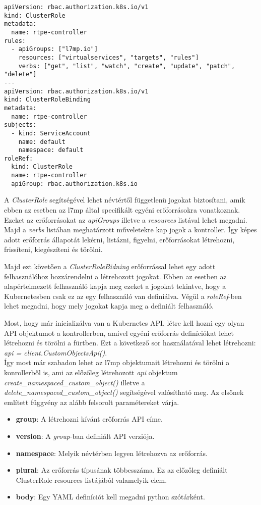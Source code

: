 \begin{lstlisting}
apiVersion: rbac.authorization.k8s.io/v1
kind: ClusterRole
metadata:
  name: rtpe-controller
rules:
  - apiGroups: ["l7mp.io"]
    resources: ["virtualservices", "targets", "rules"]
    verbs: ["get", "list", "watch", "create", "update", "patch", "delete"]
---
apiVersion: rbac.authorization.k8s.io/v1
kind: ClusterRoleBinding
metadata:
  name: rtpe-controller
subjects:
  - kind: ServiceAccount
    name: default
    namespace: default
roleRef:
  kind: ClusterRole
  name: rtpe-controller
  apiGroup: rbac.authorization.k8s.io
\end{lstlisting}

A \textit{ClusterRole} segítségével lehet névtértől függetlenü jogokat biztosítani,
amik ebben az esetben az l7mp által specifikált egyéni erőforrásokra vonatkoznak. 
Ezeket az erőforrásokat az \textit{apiGroups} illetve a \textit{resources} listával
lehet megadni. Majd a \textit{verbs} listában meghatárzott műveletekre kap 
jogok a kontroller. Így képes adott erőforrás állapotát lekérni, listázni, figyelni,
erőforrásokat létrehozni, frissíteni, kiegészíteni és törölni. 

Majd ezt követően a \textit{ClusterRoleBidning} erőforrással lehet egy adott
felhasználóhoz hozzárendelni a létrehozott jogokat. Ebben az esetben az alapértelmezett
felhasználó kapja meg ezeket a jogokat tekintve, hogy a Kubernetesben csak ez az egy
felhasználó van definiálva. Végül a \textit{roleRef}-ben lehet megadni, hogy mely
jogokat kapja meg a definiált felhasználó. 

Most, hogy már inicializálva van a Kubernetes API, létre kell hozni egy olyan 
API objektumot a kontrollerben, amivel egyéni erőforrás definíciókat lehet létrehozni
és törölni a fürtben. Ezt a következő sor használatával lehet létrehozni: 
\textit{api = client.CustomObjectsApi()}. \\

Így most már szabadon lehet az l7mp objektumait létrehozni és törölni a konrollerből is, 
ami az előzőleg létrehozott \textit{api} objektum \textit{create\_namespaced\_custom\_object()}
illetve a \textit{delete\_namespaced\_custom\_object()} segítségével valósítható meg. Az elsőnek
említett függvény az alább felsorolt paramétereket várja.

\begin{itemize}
	\item \textbf{group}: A létrehozni kívánt erőforrás API címe.  
	\item \textbf{version}: A \textit{group}-ban definiált API verziója. 
	\item \textbf{namespace}: Melyik névtérben legyen létrehozva az erőforrás.
	\item \textbf{plural}: Az erőforrás típusának többesszáma. Ez az előzőleg definiált
	ClusterRole resources listájából valamelyik elem. 
	\item \textbf{body}: Egy YAML definíciót kell megadni python szótárként. 
\end{itemize}

